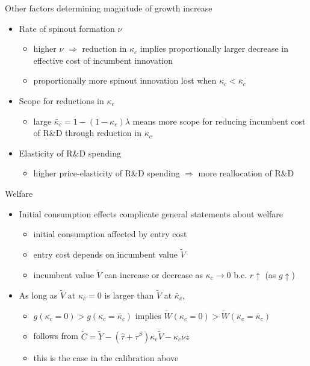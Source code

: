 \documentclass[english,usenames,dvipsnames]{beamer}
\begin{document}
\begin{frame}{Other factors determining magnitude of growth increase}\label{other_factors}
	\hyperlink{reducing_kappa_c_table}{}
	\begin{itemize}
		\item <+-> Rate of spinout formation $\nu$
		\begin{itemize}
			\item higher $\nu$ $\Rightarrow$ reduction in $\kappa_c$ implies proportionally larger decrease in effective cost of incumbent innovation
			\item proportionally more spinout innovation lost when $\kappa_c < \bar{\kappa}_c$ 
		\end{itemize}
		\medskip
		\item <+-> Scope for reductions in $\kappa_c$
		\begin{itemize}
			\item large $\bar{\kappa}_c = 1 - (1-\kappa_e)\lambda $ means more scope for reducing incumbent cost of R\&D through reduction in $\kappa_c$
		\end{itemize}
		\medskip
		\item <+-> Elasticity of R\&D spending 
		\begin{itemize}
			\item higher price-elasticity of R\&D spending $\Rightarrow$ more reallocation of R\&D
		\end{itemize}
	\end{itemize}
\end{frame}

\begin{frame}{Welfare}\label{welfare_details}
	\hyperlink{reducing_kappa_c_table}{}
	\begin{itemize}
		\item Initial consumption effects complicate general statements about welfare
		\begin{itemize}
			\item initial consumption affected by entry cost
			\item entry cost depends on incumbent value $\tilde{V}$ 
			\item incumbent value $\tilde{V}$ can increase or decrease as $\kappa_c \to 0$ b.c. $r \uparrow$ (as $g \uparrow$)
		\end{itemize}
		\medskip
		\item As long as $\tilde{V}$ at $\kappa_c = 0$ is larger than $\tilde{V}$ at $\bar{\kappa}_c$,
		\begin{itemize}
			\item $g(\kappa_c = 0) > g(\kappa_c = \bar{\kappa}_c)$ implies $\tilde{W}(\kappa_c = 0) > \tilde{W}(\kappa_c = \bar{\kappa}_c)$
			\smallskip
			\item follows from $\tilde{C} = \tilde{Y} - (\hat{\tau} + \tau^S)\kappa_e \tilde{V} - \kappa_c \nu z$
			\item this is the case in the calibration above
		\end{itemize}
	\end{itemize}
\end{frame}
\end{document}
